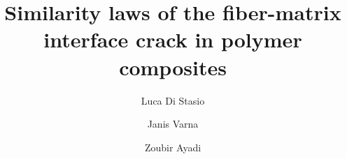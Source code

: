 \documentclass[a4paper,fleqn]{cas-dc}
\begin{document}
\let\WriteBookmarks\relax
\def\floatpagepagefraction{1}
\def\textpagefraction{.001}

\title [mode = title]{Similarity laws of the fiber-matrix interface crack in polymer composites}                      





\author[1,2]{Luca {Di Stasio}}%


\author[1]{Janis Varna}

\author[2]{Zoubir Ayadi}



\address[1]{Lule\aa\ University of Technology, University Campus, SE-97187 Lule\aa, Sweden}

\address[2]{Universit\'e de Lorraine, EEIGM, IJL, 6 Rue Bastien Lepage, F-54010 Nancy, France}

%
%
%
\end{document}
